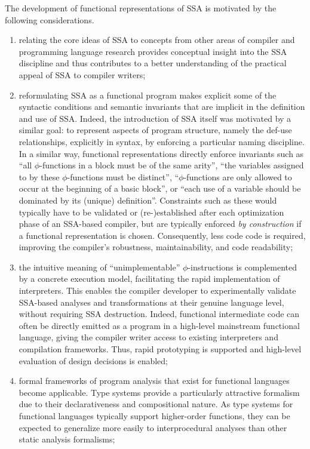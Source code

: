 The development of functional representations of SSA is motivated by
the following considerations.

\begin{enumerate}
\item relating the core ideas of SSA to concepts from other
areas of compiler and programming language research provides
conceptual insight into the SSA discipline and thus contributes to a
better understanding of the practical appeal of SSA to compiler
writers;

\item
reformulating SSA as a functional program makes explicit some of the
syntactic conditions and semantic invariants that are implicit in
the definition and use of SSA. Indeed, the introduction of
SSA itself was motivated by a similar goal: to represent aspects of
program structure, namely the def-use relationships,
explicitly in syntax, by enforcing a particular naming discipline. In
a similar way, functional representations directly enforce
invariants such as ``all $\phi$-functions in a block must be of the
same arity'', ``the variables assigned to by these $\phi$-functions
must be distinct'', ``$\phi$-functions are only allowed to occur at
the beginning of a basic block'', or ``each use of a variable should
be dominated by its (unique) definition''. Constraints such as these
would typically have to be validated or (re-)established after each
optimization phase of an SSA-based compiler, but are typically
enforced \emph{by construction} if a functional representation is
chosen. Consequently, less code code is required, improving the
compiler's robustness, maintainability, and code readability;

\item the intuitive meaning of ``unimplementable'' $\phi$-instructions is
complemented by a concrete execution model, facilitating the rapid
implementation of interpreters. This enables the compiler developer to
experimentally validate SSA-based analyses and transformations at
their genuine language level, without requiring SSA
destruction. Indeed, functional intermediate code can often be
directly emitted as a program in a high-level mainstream functional
language, giving the compiler writer access to existing interpreters
and compilation frameworks. Thus, rapid prototyping is supported and
high-level evaluation of design decisions is enabled;

\item 
formal frameworks of program analysis that exist for functional
languages become applicable. Type systems provide a particularly
attractive formalism due to their declarativeness and compositional
nature. As type systems for functional languages typically support
higher-order functions, they can be expected to generalize more easily
to interprocedural analyses than other static analysis formalisms;


\end{enumerate}
